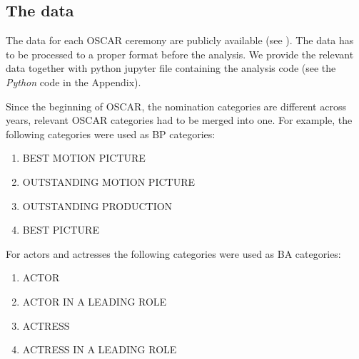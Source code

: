 \documentclass[10pt,letterpaper]{article}
\begin{document}



\subsection*{The data}
The data for each OSCAR ceremony are publicly available (see \cite{oscar_data_base}). The data has to be processed to a proper format before the analysis. We provide the relevant data together with python jupyter file containing the analysis code  (see the \emph{Python} code in the Appendix).

Since the beginning of OSCAR, the nomination categories are different across years, relevant OSCAR categories had to be merged into one. For example, the following categories were used as BP categories:

\begin{enumerate}
  \item BEST MOTION PICTURE
  \item OUTSTANDING MOTION PICTURE
  \item OUTSTANDING PRODUCTION
  \item BEST PICTURE
  \end{enumerate}
  
  For actors and actresses the following categories were used as BA categories:
\begin{enumerate}
  \item ACTOR
  \item ACTOR IN A LEADING ROLE
  \item ACTRESS
  \item ACTRESS IN A LEADING ROLE
\end{enumerate}  
  
\end{document}
